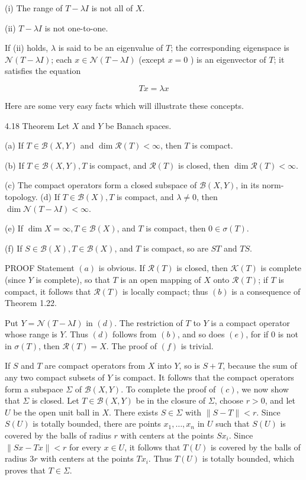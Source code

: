 \documentclass[10pt]{article}
\begin{document}
(i) The range of $T-\lambda I$ is not all of $X$.

(ii) $T-\lambda I$ is not one-to-one.

If (ii) holds, $\lambda$ is said to be an eigenvalue of $T$; the corresponding eigenspace is $\mathscr{N}(T-\lambda I)$; each $x \in \mathscr{N}(T-\lambda I)$ (except $x=0$ ) is an eigenvector of $T$; it satisfies the equation

$$
T x=\lambda x
$$

Here are some very easy facts which will illustrate these concepts.

4.18 Theorem Let $X$ and $Y$ be Banach spaces.

(a) If $T \in \mathscr{B}(X, Y)$ and $\operatorname{dim} \mathscr{R}(T)<\infty$, then $T$ is compact.

(b) If $T \in \mathscr{B}(X, Y), T$ is compact, and $\mathscr{R}(T)$ is closed, then $\operatorname{dim} \mathscr{R}(T)<\infty$.

(c) The compact operators form a closed subspace of $\mathscr{B}(X, Y)$, in its norm-topology.
(d) If $T \in \mathscr{B}(X), T$ is compact, and $\lambda \neq 0$, then $\operatorname{dim} \mathscr{N}(T-\lambda I)<\infty$.

(e) If $\operatorname{dim} X=\infty, T \in \mathscr{B}(X)$, and $T$ is compact, then $0 \in \sigma(T)$.

(f) If $S \in \mathscr{B}(X), T \in \mathscr{B}(X)$, and $T$ is compact, so are $S T$ and $T S$.

PROOF Statement $(a)$ is obvious. If $\mathscr{R}(T)$ is closed, then $\mathscr{K}(T)$ is complete (since $Y$ is complete), so that $T$ is an open mapping of $X$ onto $\mathscr{R}(T)$; if $T$ is compact, it follows that $\mathscr{R}(T)$ is locally compact; thus $(b)$ is a consequence of Theorem 1.22.

Put $Y=\mathscr{N}(T-\lambda I)$ in $(d)$. The restriction of $T$ to $Y$ is a compact operator whose range is $Y$. Thus $(d)$ follows from $(b)$, and so does $(e)$, for if 0 is not in $\sigma(T)$, then $\mathscr{R}(T)=X$. The proof of $(f)$ is trivial.

If $S$ and $T$ are compact operators from $X$ into $Y$, so is $S+T$, because the sum of any two compact subsets of $Y$ is compact. It follows that the compact operators form a subspace $\Sigma$ of $\mathscr{B}(X, Y)$. To complete the proof of $(c)$, we now show that $\Sigma$ is closed. Let $T \in \mathscr{B}(X, Y)$ be in the closure of $\Sigma$, choose $r>0$, and let $U$ be the open unit ball in $X$. There exists $S \in \Sigma$ with $\|S-T\|<r$. Since $S(U)$ is totally bounded, there are points $x_{1}, \ldots, x_{n}$ in $U$ such that $S(U)$ is covered by the balls of radius $r$ with centers at the points $S x_{i}$. Since $\|S x-T x\|<r$ for every $x \in U$, it follows that $T(U)$ is covered by the balls of radius $3 r$ with centers at the points $T x_{i}$. Thus $T(U)$ is totally bounded, which proves that $T \in \Sigma$.
\end{document}
